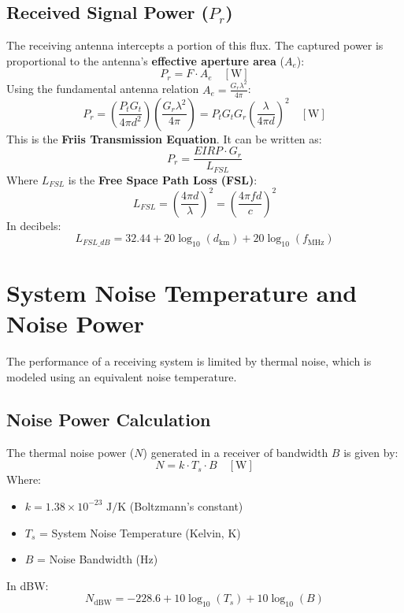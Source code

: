 \documentclass[12pt,a4paper]{article}
\begin{document}
\subsection{Received Signal Power ($P_r$)}
The receiving antenna intercepts a portion of this flux. The captured power is proportional to the antenna's \textbf{effective aperture area} ($A_e$):
\begin{equation}
  P_r = F \cdot A_e \quad [\text{W}]
\end{equation}
Using the fundamental antenna relation $A_e = \frac{G_r \lambda^2}{4\pi}$:
\begin{equation}
  P_r = \left( \frac{P_t G_t}{4\pi d^2} \right) \left( \frac{G_r \lambda^2}{4\pi} \right) = P_t G_t G_r \left( \frac{\lambda}{4\pi d} \right)^2 \quad [\text{W}]
\end{equation}
This is the \textbf{Friis Transmission Equation}. It can be written as:
\begin{equation}
  P_r = \frac{EIRP \cdot G_r}{L_{FSL}}
\end{equation}
Where $L_{FSL}$ is the \textbf{Free Space Path Loss (FSL)}:
\begin{equation}
  L_{FSL} = \left( \frac{4\pi d}{\lambda} \right)^2 = \left( \frac{4\pi f d}{c} \right)^2
\end{equation}
In decibels:
\begin{equation}
  L_{FSL\_dB} = 32.44 + 20\log_{10}(d_{\text{km}}) + 20\log_{10}(f_{\text{MHz}})
\end{equation}

\section{System Noise Temperature and Noise Power}

The performance of a receiving system is limited by thermal noise, which is modeled using an equivalent noise temperature.

\subsection{Noise Power Calculation}
The thermal noise power ($N$) generated in a receiver of bandwidth $B$ is given by:
\begin{equation}
  N = k \cdot T_s \cdot B \quad [\text{W}]
\end{equation}
Where:
\begin{itemize}[leftmargin=*, itemsep=3pt]
  \item $k = 1.38 \times 10^{-23} \text{ J/K}$ (Boltzmann's constant)
  \item $T_s$ = System Noise Temperature (Kelvin, K)
  \item $B$ = Noise Bandwidth (Hz)
\end{itemize}
In dBW:
\begin{equation}
  N_{\text{dBW}} = -228.6 + 10\log_{10}(T_s) + 10\log_{10}(B)
\end{equation}
\end{document}
